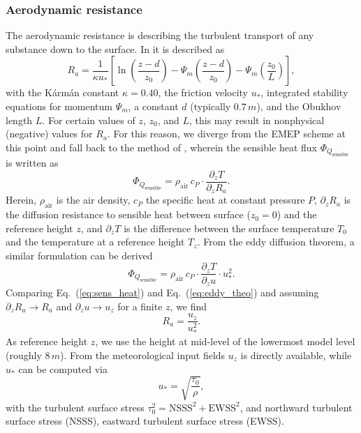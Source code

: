 \documentclass[gmd, manuscript]{copernicus}
\begin{document}
\subsubsection{Aerodynamic resistance}
\label{subsubsec:Ra}
The aerodynamic resistance is describing the turbulent transport of any substance down to the surface. In \citet{WASP:Simpson2003,ACP:Simpson2012} it is described as
\begin{equation}
  R_a = \frac{1}{\kappa u_*}\left[{\ln{\left(\frac{z-d}{z_0}\right)}-\Psi_m\left(\frac{z-d}{z_0}\right)-\Psi_m\left(\frac{z_0}{L}\right)}\right],
\end{equation}
with the K\'{a}rm\'{a}n constant $\kappa = 0.40$, the friction velocity $u_*$, integrated stability equations for momentum $\Psi_m$,  a constant $d$ (typically $0.7\,\unit{m}$), and the Obukhov length $L$. For certain values of $z$, $z_0$, and $L$, this may result in nonphysical (negative) values for $R_a$. For this reason, we diverge from the EMEP scheme at this point and fall back to the method of \citet{Monteith1973}, wherein the sensible heat flux $\Phi_{Q_\text{sensible}}$ is written as
\begin{equation}
  \Phi_{Q_\text{sensible}} = \rho_\text{air}\,c_P \cdot \frac{\partial_z T}{\partial_z R_a}.
  \label{eq:sens_heat}
\end{equation}
Herein, $\rho_\text{air}$ is the air density, $c_P$ the specific heat at constant pressure $P$, $\partial_z R_a$ is the diffusion resistance to sensible heat between surface ($z_0 = 0$) and the reference height $z$, and $\partial_z T$ is the difference between the surface temperature $T_0$ and the temperature at a reference height $T_z$. From the eddy diffusion theorem, a similar formulation can be derived
\begin{equation}
  \Phi_{Q_\text{sensible}} = \rho_\text{air}\,c_P \cdot \frac{\partial_z T}{\partial_z u} \cdot u_*^2.
  \label{eq:eddy_theo}
\end{equation}
Comparing Eq.~(\ref{eq:sens_heat}) and Eq.~(\ref{eq:eddy_theo}) and assuming $\partial_z R_a \rightarrow R_a $ and $\partial_z u \rightarrow u_z $ for a finite $z$, we find 
\begin{equation}
  R_a = \frac{u_z}{u_*^2}.
\end{equation}
As reference height $z$, we use the height at mid-level of the lowermost model level (roughly $8\,\unit{m}$). From the meteorological input fields $u_z$ is directly available, while $u_*$ can be computed via
\begin{equation}
  u_* = \sqrt{\frac{\tau_0}{\rho}},
\end{equation}
with the turbulent surface stress $\tau_0^2 = \text{NSSS}^2 + \text{EWSS}^2$, and northward turbulent surface stress (NSSS), eastward turbulent surface stress (EWSS).
\end{document}
